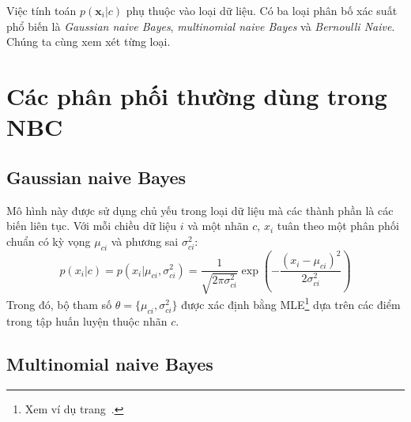 
Việc tính toán $p(\mathbf{x}_i | c) $ phụ thuộc vào loại dữ liệu. Có ba loại
phân bố xác suất phổ biến là \textit{Gaussian naive Bayes},
\textit{multinomial naive Bayes} và \textit{Bernoulli Naive}. Chúng ta cùng xem xét  từng loại.





\section{Các phân phối thường dùng trong NBC}


\subsection{Gaussian naive Bayes }
Mô hình này được sử dụng chủ yếu trong loại dữ liệu mà các thành phần là các
biến liên tục. Với mỗi chiều dữ liệu $i$ và một nhãn $c$, $x_i$ tuân theo một
phân phối chuẩn có kỳ vọng $\mu_{ci}$ và phương sai $\sigma_{ci}^2$:
\begin{equation}
\label{eqn:32_8}
p(x_i|c) = p(x_i | \mu_{ci}, \sigma_{ci}^2) =  \frac{1}{\sqrt{2\pi \sigma_{ci}^2}} \exp\left(- \frac{(x_i - \mu_{ci})^2}{2 \sigma_{ci}^2}\right)
\end{equation}
Trong đó, bộ tham số $\theta = \{\mu_{ci}, \sigma_{ci}^2\}$ được xác định bằng
MLE\footnote{Xem ví dụ trang~\pageref{sssec:gassian_mle}.} dựa trên các điểm trong tập huấn luyện thuộc nhãn $c$.


\subsection{Multinomial naive Bayes }

